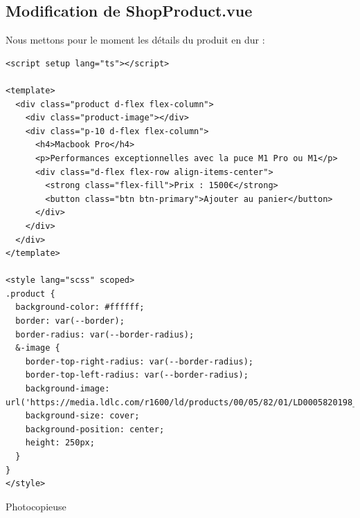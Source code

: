 \subsection{Modification de {\color{monOrange}ShopProduct.vue}}
Nous mettons pour le moment les détails du produit en dur :
\begin{verbatim}
<script setup lang="ts"></script>

<template>
  <div class="product d-flex flex-column">
    <div class="product-image"></div>
    <div class="p-10 d-flex flex-column">
      <h4>Macbook Pro</h4>
      <p>Performances exceptionnelles avec la puce M1 Pro ou M1</p>
      <div class="d-flex flex-row align-items-center">
        <strong class="flex-fill">Prix : 1500€</strong>
        <button class="btn btn-primary">Ajouter au panier</button>
      </div>
    </div>
  </div>
</template>

<style lang="scss" scoped>
.product {
  background-color: #ffffff;
  border: var(--border);
  border-radius: var(--border-radius);
  &-image {
    border-top-right-radius: var(--border-radius);
    border-top-left-radius: var(--border-radius);
    background-image: url('https://media.ldlc.com/r1600/ld/products/00/05/82/01/LD0005820198_1.jpg');
    background-size: cover;
    background-position: center;
    height: 250px;
  }
}
</style>
\end{verbatim}

Photocopieuse
